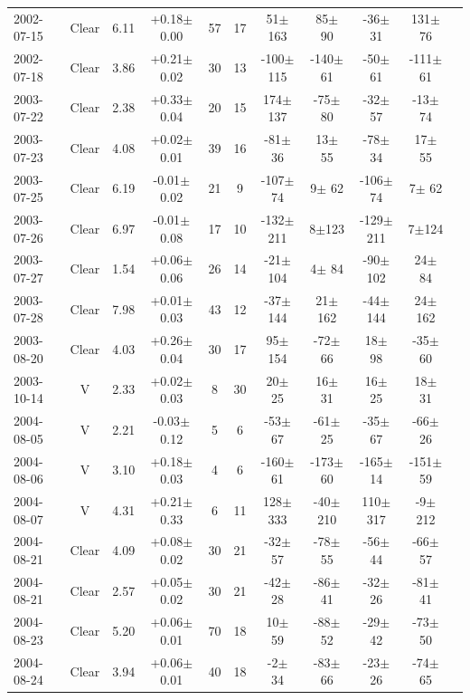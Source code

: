 \documentclass[12pt,a4paper]{report}
\begin{document}
\begin{landscape}
\begin{longtable}{|l|c|c|c|c|c|c|c|c|c|c|}
2002-07-15 & Clear & 6.11 & +0.18$\pm$0.00 &  57 &  17 &   51$\pm$163 &   85$\pm$ 90 &  -36$\pm$ 31 &  131$\pm$ 76 \\ 
2002-07-18 & Clear & 3.86 & +0.21$\pm$0.02 &  30 &  13 & -100$\pm$115 & -140$\pm$ 61 &  -50$\pm$ 61 & -111$\pm$ 61 \\ 
2003-07-22 & Clear & 2.38 & +0.33$\pm$0.04 &  20 &  15 &  174$\pm$137 &  -75$\pm$ 80 &  -32$\pm$ 57 &  -13$\pm$ 74 \\ 
2003-07-23 & Clear & 4.08 & +0.02$\pm$0.01 &  39 &  16 &  -81$\pm$ 36 &   13$\pm$ 55 &  -78$\pm$ 34 &   17$\pm$ 55 \\ 
2003-07-25 & Clear & 6.19 & -0.01$\pm$0.02 &  21 &   9 & -107$\pm$ 74 &    9$\pm$ 62 & -106$\pm$ 74 &    7$\pm$ 62 \\ 
2003-07-26 & Clear & 6.97 & -0.01$\pm$0.08 &  17 &  10 & -132$\pm$211 &    8$\pm$123 & -129$\pm$211 &    7$\pm$124 \\ 
2003-07-27 & Clear & 1.54 & +0.06$\pm$0.06 &  26 &  14 &  -21$\pm$104 &    4$\pm$ 84 &  -90$\pm$102 &   24$\pm$ 84 \\ 
2003-07-28 & Clear & 7.98 & +0.01$\pm$0.03 &  43 &  12 &  -37$\pm$144 &   21$\pm$162 &  -44$\pm$144 &   24$\pm$162 \\ 
2003-08-20 & Clear & 4.03 & +0.26$\pm$0.04 &  30 &  17 &   95$\pm$154 &  -72$\pm$ 66 &   18$\pm$ 98 &  -35$\pm$ 60 \\ 
2003-10-14 & V     & 2.33 & +0.02$\pm$0.03 &   8 &  30 &   20$\pm$ 25 &   16$\pm$ 31 &   16$\pm$ 25 &   18$\pm$ 31 \\ 
2004-08-05 & V     & 2.21 & -0.03$\pm$0.12 &   5 &   6 &  -53$\pm$ 67 &  -61$\pm$ 25 &  -35$\pm$ 67 &  -66$\pm$ 26 \\ 
2004-08-06 & V     & 3.10 & +0.18$\pm$0.03 &   4 &   6 & -160$\pm$ 61 & -173$\pm$ 60 & -165$\pm$ 14 & -151$\pm$ 59 \\ 
2004-08-07 & V     & 4.31 & +0.21$\pm$0.33 &   6 &  11 &  128$\pm$333 &  -40$\pm$210 &  110$\pm$317 &   -9$\pm$212 \\ 
2004-08-21 & Clear & 4.09 & +0.08$\pm$0.02 &  30 &  21 &  -32$\pm$ 57 &  -78$\pm$ 55 &  -56$\pm$ 44 &  -66$\pm$ 57 \\ 
2004-08-21 & Clear & 2.57 & +0.05$\pm$0.02 &  30 &  21 &  -42$\pm$ 28 &  -86$\pm$ 41 &  -32$\pm$ 26 &  -81$\pm$ 41 \\ 
2004-08-23 & Clear & 5.20 & +0.06$\pm$0.01 &  70 &  18 &   10$\pm$ 59 &  -88$\pm$ 52 &  -29$\pm$ 42 &  -73$\pm$ 50 \\ 
2004-08-24 & Clear & 3.94 & +0.06$\pm$0.01 &  40 &  18 &   -2$\pm$ 34 &  -83$\pm$ 66 &  -23$\pm$ 26 &  -74$\pm$ 65 \\ 

\end{longtable}
\end{landscape}
\end{document}
